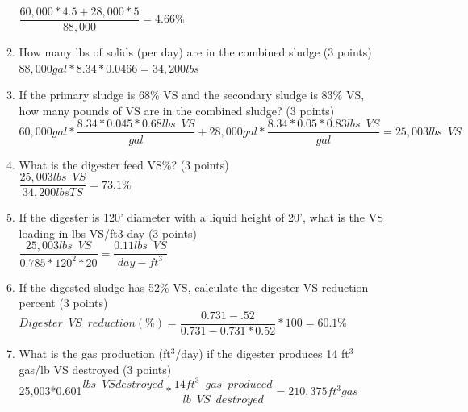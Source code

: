 \documentclass{article}
\begin{document}
\begin{enumerate}
\begin{enumerate}
$\dfrac{60,000*4.5+28,000*5}{88,000}=\boxed{4.66\%}$\\
\vspace{0.5cm}
\item How many lbs of solids (per day) are in the combined sludge (3 points)\\

$88,000 gal*8.34*0.0466 = \boxed{34,200 lbs}$\\
\vspace{0.5cm}


\item If the primary sludge is 68\% VS and the secondary sludge is 83\% VS, how many pounds of VS are in the combined sludge? (3 points)\\
$60,000 gal *\dfrac{8.34*0.045*0.68lbs \enspace VS}{gal}+28,000 gal *\dfrac{8.34*0.05*0.83lbs \enspace VS}{gal}=\boxed{25,003 lbs \enspace VS}$
\vspace{2cm}

\item What is the digester feed VS\%?  (3 points)\\
$\dfrac{25,003 lbs \enspace VS}{34,200 lbs TS}=\boxed{73.1\%}$
\vspace{0.5cm}

\item If the digester is 120’ diameter with a liquid height of 20’, what is the VS loading in lbs VS/ft3-day (3 points)\\

$\dfrac{25,003 lbs \enspace VS}{0.785*120^2*20}=\boxed{\dfrac{0.11 lbs \enspace VS}{day-ft^3}}$\\
\vspace{0.5cm}

\item If the digested sludge has 52\% VS, calculate the digester VS reduction percent (3 points)\\

$
Digester \enspace VS \enspace reduction (\%)=
	\dfrac
	{0.731 - .52}
	{0.731 - 0.731 *0.52}
	*100=\boxed{60.1\%}
$\\
\vspace{0.5cm}

\item What is the gas production (ft$^3$/day) if the digester produces 14 ft$^3$ gas/lb VS destroyed (3 points)\\
25,003*0.601$\dfrac{lbs\enspace VS destroyed}{}*\dfrac{14ft^3 \enspace gas \enspace produced}{lb \enspace VS \enspace destroyed}=\boxed{210,375ft^3 gas}$
\\
\vspace{0.5cm}


\end{enumerate}
\end{enumerate}
\end{document}
